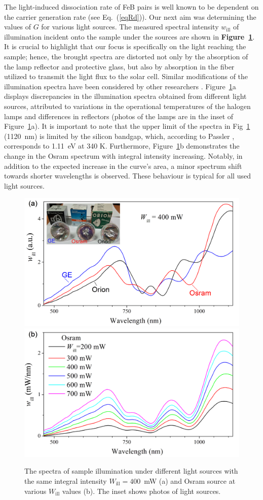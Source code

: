 \documentclass{WileyMSP-template}
\begin{document}
The light-induced dissociation rate of FeB pairs is well known
to be dependent on the carrier generation rate (see Eq.~(\ref{eqRd})).
Our next aim was determining the values of $G$ for various light sources.
The measured spectral intensity $w_\mathrm{ill}$ of illumination incident onto the sample under the sources are shown in \textbf{Figure~\ref{fig4}}.
It is crucial to highlight that our focus is specifically on the light reaching the sample;
hence, the brought spectra are distorted not only by the absorption of the lamp reflector and protective glass, but also by absorption in the fiber
utilized to transmit the light flux to the solar cell.
Similar modifications of the illumination spectra have been considered by other researchers \cite{Libra2017}.
Figure~\ref{fig4}a displays discrepancies in the illumination spectra obtained from different light sources,
attributed to variations in the operational temperatures of the halogen lamps and differences in reflectors
(photos of the lamps are in the inset of Figure~\ref{fig4}a).
It is important to note that the upper limit of the spectra in Fig~\ref{fig4} (1120~nm)
is limited by the silicon bandgap, which, according to Passler \cite{Pasler}, corresponds to 1.11~eV at 340 K.
Furthermore, Figure~\ref{fig4}b demonstrates the change in the Osram spectrum with integral intensity increasing.
Notably, in addition to the expected increase in the curve's area, a minor spectrum shift towards shorter wavelengths is observed.
These behaviour is typical for all used light sources.

\begin{figure}
\centering
  \includegraphics[width=0.4\linewidth]{Fig4a.png}
  \includegraphics[width=0.4\linewidth]{Fig4b.png}
  \caption{
  The spectra of sample illumination under different light sources with the same integral intensity $W_\mathrm{ill}=400$~mW (a) and Osram source at various $W_\mathrm{ill}$ values (b).
 The inset shows photos of light sources.
}
  \label{fig4}
\end{figure}
\end{document}
